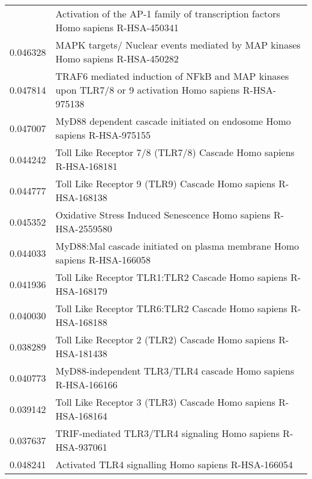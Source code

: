 \begin{longtable}{p{2.4cm}p{14.5cm}}
\bottomrule
\endlastfoot
                 0.009623 &                        Activation of the AP-1 family of transcription factors Homo sapiens R-HSA-450341 \\
                 0.046328 &                          MAPK targets/ Nuclear events mediated by MAP kinases Homo sapiens R-HSA-450282 \\
                 0.047814 &  TRAF6 mediated induction of NFkB and MAP kinases upon TLR7/8 or 9 activation Homo sapiens R-HSA-975138 \\
                 0.047007 &                                 MyD88 dependent cascade initiated on endosome Homo sapiens R-HSA-975155 \\
                 0.044242 &                                       Toll Like Receptor 7/8 (TLR7/8) Cascade Homo sapiens R-HSA-168181 \\
                 0.044777 &                                           Toll Like Receptor 9 (TLR9) Cascade Homo sapiens R-HSA-168138 \\
                 0.045352 &                                          Oxidative Stress Induced Senescence Homo sapiens R-HSA-2559580 \\
                 0.044033 &                                MyD88:Mal cascade initiated on plasma membrane Homo sapiens R-HSA-166058 \\
                 0.041936 &                                          Toll Like Receptor TLR1:TLR2 Cascade Homo sapiens R-HSA-168179 \\
                 0.040030 &                                          Toll Like Receptor TLR6:TLR2 Cascade Homo sapiens R-HSA-168188 \\
                 0.038289 &                                           Toll Like Receptor 2 (TLR2) Cascade Homo sapiens R-HSA-181438 \\
                 0.040773 &                                           MyD88-independent TLR3/TLR4 cascade Homo sapiens R-HSA-166166 \\
                 0.039142 &                                           Toll Like Receptor 3 (TLR3) Cascade Homo sapiens R-HSA-168164 \\
                 0.037637 &                                             TRIF-mediated TLR3/TLR4 signaling Homo sapiens R-HSA-937061 \\
                 0.048241 &                                                     Activated TLR4 signalling Homo sapiens R-HSA-166054 \\
\end{longtable}


